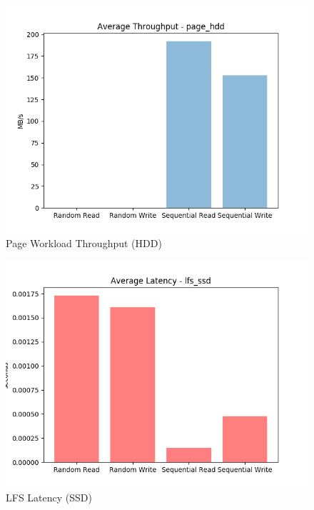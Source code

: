 \documentclass[10pt, author, twocolumn]{article}
\begin{document}
\vspace{5cm}
\begin{figure}[h!]
    \includegraphics[scale=0.5]{../graphs/page_hdd-thru.png}
    \caption{Page Workload Throughput (HDD)}
    \label{fig:hdd_page_thru}
\end{figure}

\begin{figure}[t!]
    \includegraphics[scale=0.5]{../graphs/lfs_ssd-lat.png}
    \caption{LFS Latency (SSD)}
    \label{fig:ssd_lfs_lat}
\end{figure}
\end{document}
